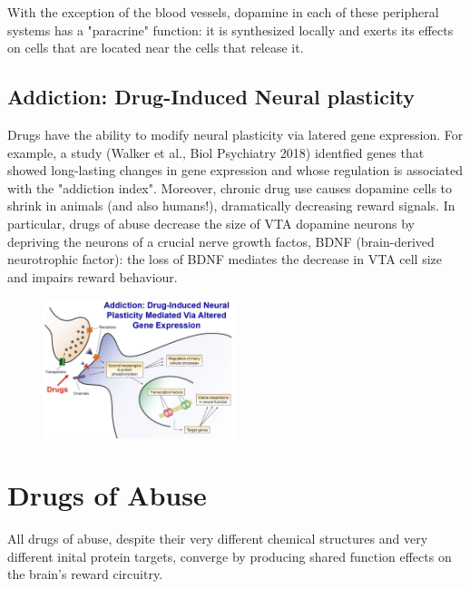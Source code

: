 \documentclass{book}
\begin{document}
With the exception of the blood vessels, dopamine in each of these peripheral systems has a "paracrine" function: it is synthesized locally and exerts its effects on cells that are located near the cells that release it.

\subsection{Addiction: Drug-Induced Neural plasticity}
Drugs have the ability to modify neural plasticity via latered gene expression.
For example, a study (Walker et al., Biol Psychiatry 2018) identfied genes that showed long-lasting changes in gene expression and whose regulation is associated with the "addiction index".
Moreover, chronic drug use causes dopamine cells to shrink in animals (and also humans!), dramatically decreasing reward signals.
In particular, drugs of abuse decrease the size of VTA dopamine neurons by depriving the neurons of a crucial nerve growth factos, BDNF (brain-derived neurotrophic factor): the loss of BDNF mediates the decrease in VTA cell size and impairs reward behaviour.

\begin{figure}[H]
    \centering
    \includegraphics[width=0.5\textwidth]{images3/image13.png}
    \caption{}
\end{figure}

\section{Drugs of Abuse}
All drugs of abuse, despite their very different chemical structures and very different inital protein targets, converge by producing shared function effects on the brain's reward circuitry.
\end{document}

